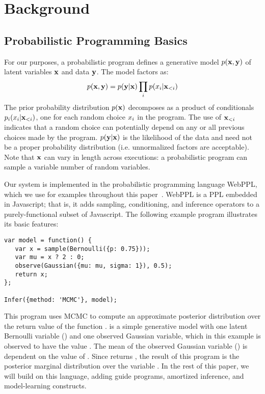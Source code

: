 \section{Background}
\label{sec:background}

\subsection{Probabilistic Programming Basics}
\label{sec:pplbasics}

For our purposes, a probabilistic program defines a generative model $p(\mathbf{x}, \mathbf{y})$ of latent variables $\mathbf{x}$ and data $\mathbf{y}$. The model factors as:
\begin{equation}
p(\mathbf{x}, \mathbf{y}) = p(\mathbf{y} | \mathbf{x}) \prod_i p(x_i | \mathbf{x}_{<i})
\label{eq:probProgDef}
\end{equation}
The prior probability distribution $p(\mathbf{x})$ decomposes as a product of conditionals $p_i(x_i | \mathbf{x}_{<i})$, one for each random choice $x_i$ in the program. The use of $\mathbf{x}_{<i}$ indicates that a random choice can potentially depend on any or all previous choices made by the program.
$p(\mathbf{y} | \mathbf{x})$ is the likelihood of the data and need not be a proper probability distribution (i.e. unnormalized factors are acceptable).
Note that $\mathbf{x}$ can vary in length across executions: a probabilistic program can sample a variable number of random variables.

Our system is implemented in the probabilistic programming language WebPPL, which we use for examples throughout this paper~\cite{WebPPL}.
WebPPL is a PPL embedded in Javascript; that is, it adds sampling, conditioning, and inference operators to a purely-functional subset of Javascript.
The following example program illustrates its basic features:
\begin{lstlisting}
var model = function() {
   var x = sample(Bernoulli({p: 0.75}));
   var mu = x ? 2 : 0;
   observe(Gaussian({mu: mu, sigma: 1}), 0.5);
   return x;
};

Infer({method: 'MCMC'}, model);
\end{lstlisting}
This program uses MCMC to compute an approximate posterior distribution over the return value of the function .  is a simple generative model with one latent Bernoulli variable () and one observed Gaussian variable, which in this example is observed to have the value . The mean of the observed Gaussian variable () is dependent on the value of . Since  returns , the result of this program is the posterior marginal distribution over the variable .
In the rest of this paper, we will build on this language, adding guide programs, amortized inference, and model-learning constructs.

